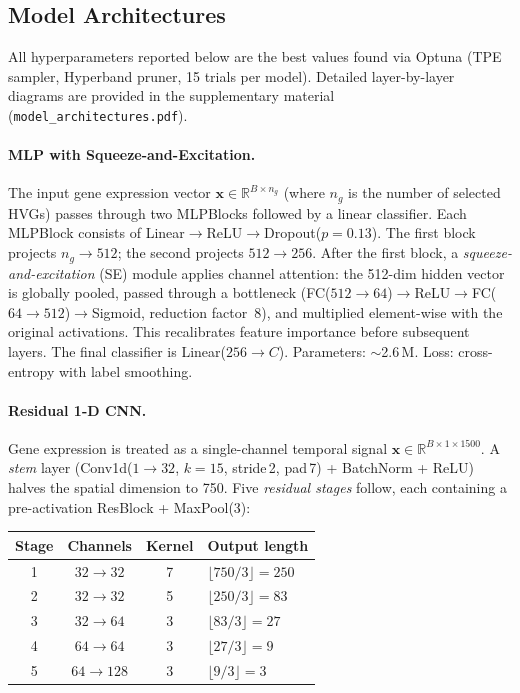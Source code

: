 \documentclass[11pt,letterpaper]{article}
\begin{document}
\subsection{Model Architectures}

All hyperparameters reported below are the best values found via Optuna
(TPE sampler, Hyperband pruner, 15 trials per model). Detailed layer-by-layer
diagrams are provided in the supplementary material
(\texttt{model\_architectures.pdf}).

\paragraph{MLP with Squeeze-and-Excitation.}
The input gene expression vector $\mathbf{x} \in \mathbb{R}^{B \times n_g}$
(where $n_g$ is the number of selected HVGs) passes through two MLPBlocks
followed by a linear classifier. Each MLPBlock consists of
Linear$\to$ReLU$\to$Dropout($p{=}0.13$). The first block projects
$n_g \to 512$; the second projects $512 \to 256$. After the first block, a
\emph{squeeze-and-excitation} (SE) module applies channel attention: the
512-dim hidden vector is globally pooled, passed through a bottleneck
(FC($512 \to 64$)$\to$ReLU$\to$FC($64 \to 512$)$\to$Sigmoid, reduction
factor~8), and multiplied element-wise with the original activations. This
recalibrates feature importance before subsequent layers. The final classifier
is Linear($256 \to C$). Parameters: ${\sim}$2.6\,M. Loss: cross-entropy with
label smoothing.

\paragraph{Residual 1-D CNN.}
Gene expression is treated as a single-channel temporal signal
$\mathbf{x} \in \mathbb{R}^{B \times 1 \times 1500}$. A \emph{stem} layer
(Conv1d($1{\to}32$, $k{=}15$, stride\,2, pad\,7) + BatchNorm + ReLU) halves
the spatial dimension to 750. Five \emph{residual stages} follow, each
containing a pre-activation ResBlock + MaxPool(3):

\begin{center}
\footnotesize
\begin{tabular}{@{}cccl@{}}
\toprule
Stage & Channels & Kernel & Output length \\
\midrule
1 & $32 \to 32$  & 7 & $\lfloor 750/3 \rfloor = 250$ \\
2 & $32 \to 32$  & 5 & $\lfloor 250/3 \rfloor = 83$ \\
3 & $32 \to 64$  & 3 & $\lfloor 83/3 \rfloor = 27$ \\
4 & $64 \to 64$  & 3 & $\lfloor 27/3 \rfloor = 9$ \\
5 & $64 \to 128$ & 3 & $\lfloor 9/3 \rfloor = 3$ \\
\bottomrule
\end{tabular}
\end{center}
\end{document}
